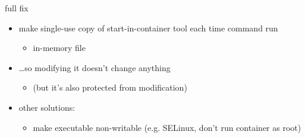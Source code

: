 \begin{frame}{full fix}
    \begin{itemize}
    \item make single-use copy of start-in-container tool each time command run
        \begin{itemize}
        \item in-memory file
        \end{itemize}
    \item \ldots so modifying it doesn't change anything
        \begin{itemize}
        \item (but it's also protected from modification)
        \end{itemize}
    \vspace{.5cm}
    \item other solutions:
        \begin{itemize}
        \item make executable non-writable (e.g. SELinux, don't run container as root)
        \end{itemize}
    \end{itemize}
\end{frame}
